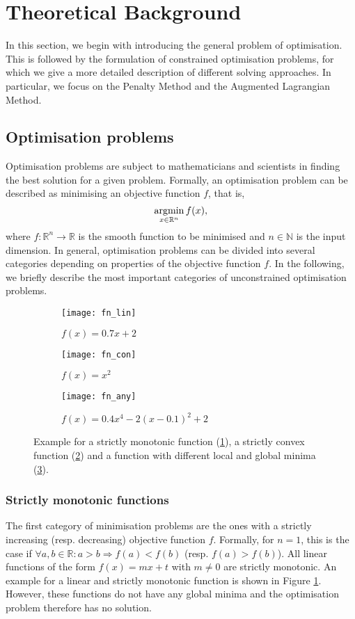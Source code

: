\label{section:theoreticalBackground}
\section{Theoretical Background}
In this section, we begin with introducing the general problem of optimisation. This is followed by the formulation of constrained optimisation problems, for which we give a more detailed description of different solving approaches. In particular, we focus on the Penalty Method and the Augmented Lagrangian Method.
\subsection{Optimisation problems}
Optimisation problems are subject to mathematicians and scientists in finding the best solution for a given problem. Formally, an optimisation problem can be described as minimising an objective function $f$, that is, 
\begin{equation}
\operatorname*{argmin}_{x \in \mathbb{R}^n} f(x),
\end{equation}
where $f\colon \mathbb{R}^n\to \mathbb{R}$ is the smooth function to be minimised and $n \in \mathbb{N}$ is the input dimension. In general, optimisation problems can be divided into several categories depending on properties of the objective function $f$. In the following, we briefly describe the most important categories of unconstrained optimisation problems.
\begin{figure}[H]
	\centering
	\begin{subfigure}{.32\textwidth}
		\centering
		\texttt{[image: fn\_lin]}
		\caption{$f(x) = 0.7x + 2$}
		\label{fn_a}
	\end{subfigure}%
	\begin{subfigure}{.32\textwidth}
	\centering
	\texttt{[image: fn\_con]}
		\caption{$f(x) = x^2$}
		\label{fn_b}
\end{subfigure}%
	\begin{subfigure}{.32\textwidth}
	\centering
	\texttt{[image: fn\_any]}
		\caption{$f(x) = 0.4x^4 - 2(x-0.1)^2 + 2$}
		\label{fn_c}
\end{subfigure}%
	\caption{Example for a strictly monotonic function (\ref{fn_a}), a strictly convex function (\ref{fn_b}) and a function with different local and global minima (\ref{fn_c}).}
	\label{fig:mu_lambda_alm_dyn}
\end{figure}
\subsubsection{Strictly monotonic functions}
The first category of minimisation problems are the ones with a strictly increasing (resp. decreasing) objective function $f$. Formally, for $n = 1$, this is the case if $\forall a, b \in \mathbb{R}: a > b \Rightarrow f(a) < f(b)$ (resp. $f(a) > f(b)$). All linear functions of the form $f(x) = mx + t$ with $m \neq 0$ are strictly monotonic. An example for a linear and strictly monotonic function is shown in Figure \ref{fn_a}. However, these functions do not have any global minima and the optimisation problem therefore has no solution.
